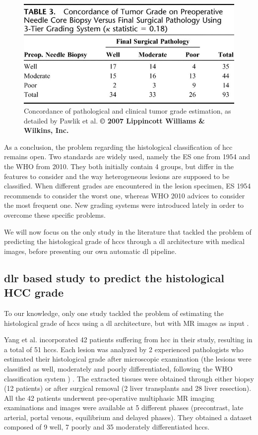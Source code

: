 \begin{figure}[th!]
\centering
\includegraphics[width=0.7\linewidth]{images/pawlik_table3}
\caption{Concordance of pathological and clinical tumor grade estimation, as detailed by Pawlik et al. \textbf{© 2007 Lippincott Williams \& Wilkins, Inc. \cite{Pawlik2007}}}
\label{fig:pawlik_table3}
\end{figure}


As a conclusion, the problem regarding the histological classification
of \ac{hcc} remains open. Two standards are widely used, namely the ES one
from 1954 and the WHO from 2010. They both initially contain 4 groups,
but differ in the features to consider and the way heterogeneous lesions
are supposed to be classified. When different grades are encountered in
the lesion specimen, ES 1954 recommends to consider the worst one,
whereas WHO 2010 advices to consider the most frequent one. New
grading systems were introduced lately in order to overcome these
specific problems.

We will now focus on the only study in the literature that tackled the
problem of predicting the histological grade of \ac{hcc}s through a \ac{dl}
architecture with medical images, before presenting our own automatic \ac{dl}
pipeline.

\subsection{\ac{dlr} based study to predict the histological HCC
grade}\label{dlr-based-study-to-predict-the-histological-hcc-grade}

To our knowledge, only one study tackled the problem of estimating the
histological grade of \ac{hcc}s using a \ac{dl} architecture, but with MR images
as input \cite{Yang2019}.

Yang et al. incorporated 42 patients suffering from \ac{hcc} in their study,
resulting in a total of 51 \ac{hcc}s. Each lesion was analyzed by 2
experienced pathologists who estimated their histological grade after
microscopic examination (the lesions were classified as well, moderately
and poorly differentiated, following the WHO classification system \cite{20113051318}) .
The extracted tissues were obtained through either biopsy (12 patients)
or after surgical removal (2 liver transplants and 28 liver resection).
All the 42 patients underwent pre-operative multiphasic MR imaging
examinations and images were available at 5 different phases
(precontrast, late arterial, portal venous, equilibrium and delayed
phases). They obtained a dataset composed of 9 well, 7 poorly and 35 moderately
differentiated \ac{hcc}s.


